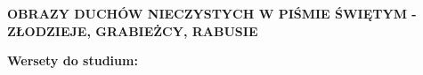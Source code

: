 \documentclass[10pt,a4paper,oneside]{article}
\begin{document}
\centerline{\textbf{\MakeUppercase{Obrazy duchów nieczystych w Piśmie Świętym - złodzieje, grabieżcy, rabusie}}}
\begin{center}
\textbf{Wersety do studium:} 

\end{center}
\end{document}
